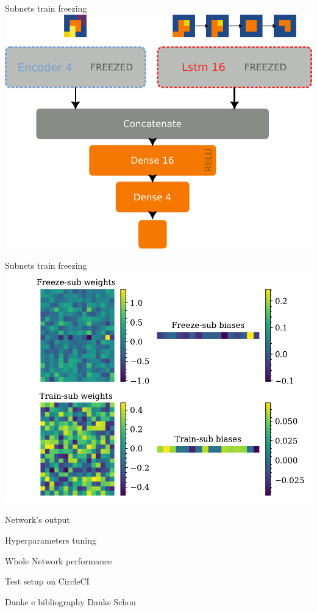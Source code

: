 \documentclass{beamer}
\begin{document}
\begin{frame}{Subnets train freezing}
    \includegraphics[width=.8\linewidth]{freezetraining_2.pdf}
\end{frame}

\begin{frame}{Subnets train freezing}
    \includegraphics[width=.8\linewidth]{freezetraining.pdf}
\end{frame}

\begin{frame}{Network's output}

    
\end{frame}

\begin{frame}{Hyperparameters tuning}

    
\end{frame}


\begin{frame}{Whole Network performance}

    
\end{frame}

\begin{frame}{Test setup on CircleCI}

    
\end{frame}

\begin{frame}{Danke e bibliography}
\centering
Danke Schon

    
\end{frame}
\end{document}

